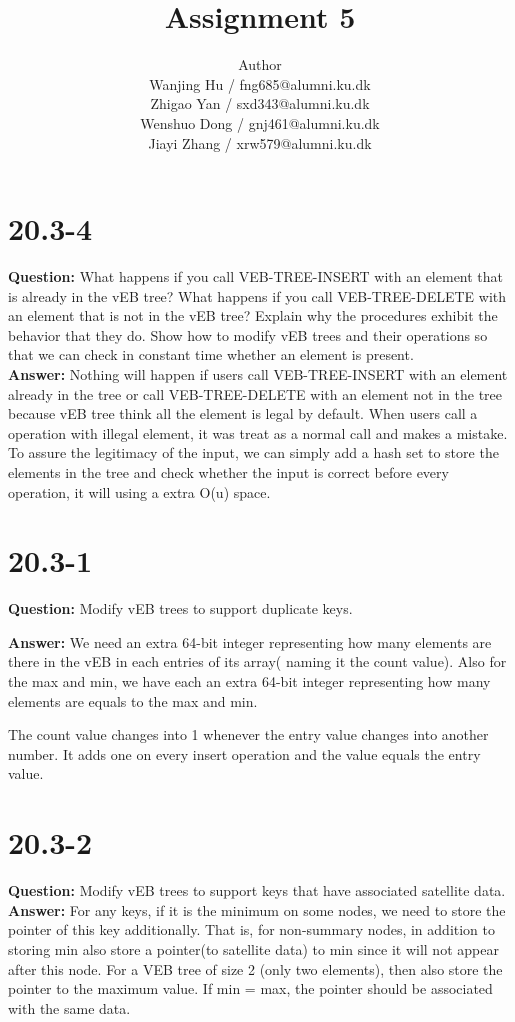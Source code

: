 \documentclass[12pt]{article}
\title{Assignment 5}
\author{Author \\
  Wanjing Hu / fng685@alumni.ku.dk  \\
  Zhigao Yan / sxd343@alumni.ku.dk  \\
  Wenshuo Dong / gnj461@alumni.ku.dk  \\
  Jiayi Zhang / xrw579@alumni.ku.dk \\
}
\begin{document}
\maketitle

\section{20.3-4}
\textbf{Question: } 
What happens if you call VEB-TREE-INSERT with an element that is already in the vEB tree? What happens if you call VEB-TREE-DELETE with an element that is not in the vEB tree? Explain why the procedures exhibit the behavior that they do. Show how to modify vEB trees and their operations so that we can check in constant time whether an element is present.\\
\textbf{Answer:}
Nothing will happen if users call VEB-TREE-INSERT with an element already in the tree or call VEB-TREE-DELETE with an element not in the tree because vEB tree think all the element is legal by default. When users call a operation with illegal element, it was treat as a normal call and makes a mistake.\\
To assure the legitimacy of the input, we can simply add a hash set to store the elements in the tree and check whether the input is correct before every operation, it will using a extra O(u) space.

\section{20.3-1}
\textbf{Question: } 
Modify vEB trees to support duplicate keys.

\textbf{Answer:}
We need an extra 64-bit integer representing how many elements are there in the vEB in each entries of its array( naming it the count value). Also for the max and min, we have each an extra  64-bit integer representing how many elements are equals to the max and min. 

The count value changes into 1 whenever the entry value changes into another number. It adds one on every insert operation and the value equals the entry value.

\section{20.3-2}
\textbf{Question:} Modify vEB trees to support keys that have associated satellite data.\\
\textbf{Answer:} For any keys, if it is the minimum on some nodes, we need to store the pointer of this key additionally. That is, for non-summary nodes, in addition to storing min also store a pointer(to satellite data) to min since it will not appear after this node.
For a VEB tree of size 2 (only two elements), then also store the pointer to the maximum value. If min = max, the pointer should be associated with the same data. 
\end{document}
